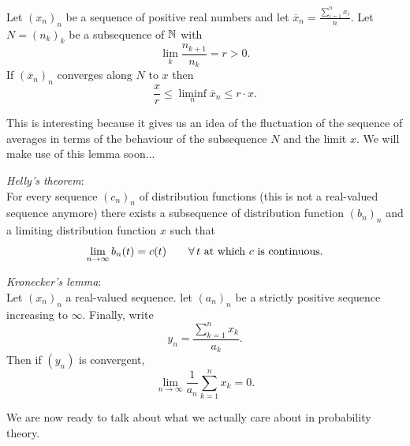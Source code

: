 \documentclass{report}
\begin{document}
\begin{lemma}
	Let ${(x_n)}_{n}$ be a sequence of positive real numbers and let $\overline{x}_n=\frac{\sum_{i=1}^{n}x_i}{n}$. Let $N={(n_k)}_{k}$ be a subsequence of $\mathbb{N}$ with 
	\[\lim_k\frac{n_{k+1}}{n_k}=r>0.\]
	If ${(\overline{x}_n)}_{n}$ converges along $N$ to $x$ then
	\[\frac{x}{r}\leq\liminf_n\overline{x}_n\leq r\cdot x.\]
\end{lemma}
This is interesting because it gives us an idea of the fluctuation of the sequence of averages in terms of the behaviour of the subsequence $N$ and the limit $x$. We will make use of this lemma soon...
\begin{theorem}
	\emph{Helly's theorem}:\\
	For every sequence ${(c_n)}_{n}$ of distribution functions (this is not a real-valued sequence anymore) there exists a subsequence of distribution function ${(b_n)}_{n}$ and a limiting distribution function $x$ such that
	\[\lim_{n\to\infty}b_n(t)=c(t)\qquad\forall\, t\text{ at which $c$ is continuous.}\]
\end{theorem}
\begin{lemma}
	\emph{Kronecker's lemma}:\\
	Let ${(x_n)}_{n}$ a real-valued sequence. let ${(a_n)}_{n}$ be a strictly positive sequence increasing to $\infty$. Finally, write 
	\[y_n=\frac{\sum_{k=1}^{n}x_k}{a_k}.\]
	Then if $(y_n)$ is convergent,
	\[\lim_{n\to\infty}\frac{1}{a_n}\sum_{k=1}^{n}x_k=0.\]
\end{lemma}
We are now ready to talk about what we actually care about in probability theory.
\end{document}
